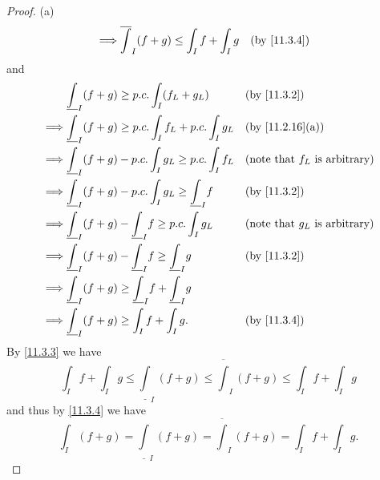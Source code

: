 \begin{proof}{(a)}
\begin{align*}
    \implies & \overline{\int}_I (f + g) \leq \int_I f + \int_I g                       &   & \text{(by \cref{11.3.4})}
  \end{align*}
  and
  \begin{align*}
             & \underline{\int}_I (f + g) \geq p.c. \int_I (f_L + g_L)                     &   & \text{(by \cref{11.3.2})}               \\
    \implies & \underline{\int}_I (f + g) \geq p.c. \int_I f_L + p.c. \int_I g_L           &   & \text{(by \cref{11.2.16}(a))}           \\
    \implies & \underline{\int}_I (f + g) - p.c. \int_I g_L \geq p.c. \int_I f_L           &   & \text{(note that \(f_L\) is arbitrary)} \\
    \implies & \underline{\int}_I (f + g) - p.c. \int_I g_L \geq \underline{\int}_I f      &   & \text{(by \cref{11.3.2})}               \\
    \implies & \underline{\int}_I (f + g) - \underline{\int}_I f \geq p.c. \int_I g_L      &   & \text{(note that \(g_L\) is arbitrary)} \\
    \implies & \underline{\int}_I (f + g) - \underline{\int}_I f \geq \underline{\int}_I g &   & \text{(by \cref{11.3.2})}               \\
    \implies & \underline{\int}_I (f + g) \geq \underline{\int}_I f + \underline{\int}_I g &                                             \\
    \implies & \underline{\int}_I (f + g) \geq \int_I f + \int_I g.                        &   & \text{(by \cref{11.3.4})}
  \end{align*}
  By \cref{11.3.3} we have
  \[
    \int_I f + \int_I g \leq \underline{\int}_I (f + g) \leq \overline{\int}_I (f + g) \leq \int_I f + \int_I g
  \]
  and thus by \cref{11.3.4} we have
  \[
    \int_I (f + g) = \underline{\int}_I (f + g) = \overline{\int}_I (f + g) = \int_I f + \int_I g.
  \]
\end{proof}

